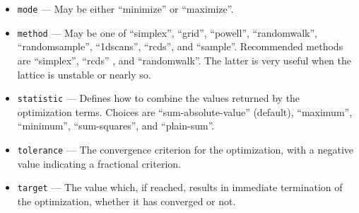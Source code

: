 \documentclass[11pt]{article}
\begin{document}
\begin{itemize}
There are several {\tt rpn} functions that are useful in constructing
a good optimization equation.  These are ``soft-edge'' greater-than, less-than,
and not-equal functions, which have the names {\tt segt}, {\tt selt}, and
{\tt sene}, respectively.  The usage is as follows:
\begin{itemize}
\item {\em V1} {\em V2} {\em T} {\tt segt}.  Returns a
 nonzero value if and only if value {\em V1} is greater than {\em V2}.  The 
 returned value is $((V_1-V_2)/T)^2$.  Typically used to constraint a quantity from
 above.  E.g., to limit the maximum horizontal beta function to 10m with
 a tolerance of $T=0.1m$, one would use \verb|max.betax 10 .1 segt|.
\item {\em V1} {\em V2} {\em T} {\tt selt}.  Returns a
 nonzero value if and only if value {\em V1} is less than value {\em V2}.  The 
 returned value is $((V_1-V_2)/T)^2$.    Typically used to constrain a value from
 below.  E.g., to limit a beta function to greater than 3 m with a tolerance of 0.1 m,
 one would use \verb|betax 3 .1 selt|.
\item {\em V1} {\em V2} {\em T} {\tt sene}.  Returns a nonzero value
 if and only if {\em V1} and {\em V2} differ by more than {\em tol}.  If
 $V_1>V_2$, returns $((V_1-(V_2+T))/T)^2$.  If $V_2>V_1$, returns
 $((V_2-(V_1+T))/T)^2$.
\end{itemize}
\item \verb|mode| --- May be either ``minimize'' or ``maximize''.

\item \verb|method| --- May be one of ``simplex'', ``grid'', ``powell'', ``randomwalk'', ``randomsample'', ``1dscans'',
  ``rcds'', and ``sample''.  Recommended methods are ``simplex'', ``rcds'' \cite{Huang-RCDS}, and ``randomwalk''. The
  latter is very useful when the lattice is unstable or nearly so.

\item \verb|statistic| --- Defines how to combine the values returned by the optimization terms. Choices are
  ``sum-absolute-value'' (default), ``maximum'', ``minimum'', ``sum-squares'', and ``plain-sum''.
  
\item \verb|tolerance| --- The convergence criterion for the optimization, with a negative value indicating
a fractional criterion.
\item \verb|target| --- The value which, if reached, results in immediate termination of the optimization,
whether it has converged or not.


\end{itemize}
\end{document}
